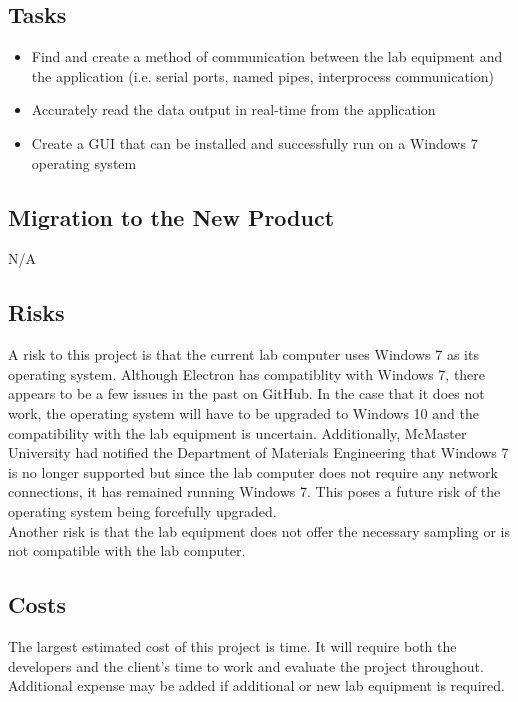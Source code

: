 \documentclass[12pt, titlepage]{article}
\begin{document}
\subsection{Tasks}
\begin{itemize}
  \item Find and create a method of communication between the lab equipment and the application (i.e. serial ports, named pipes, interprocess communication)
  \item Accurately read the data output in real-time from the application
  \item Create a GUI that can be installed and successfully run on a Windows 7 operating system
\end{itemize}

\subsection{Migration to the New Product}
N/A

\subsection{Risks}
A risk to this project is that the current lab computer uses Windows 7 as its operating system. Although Electron has compatiblity with Windows 7, there appears to be a few issues in the past on GitHub. 
In the case that it does not work, the operating system will have to be upgraded to Windows 10 and the compatibility with the lab equipment is uncertain. Additionally, McMaster University had notified the 
Department of Materials Engineering that Windows 7 is no longer supported but since the lab computer does not require any network connections, it has remained running Windows 7. This poses a future risk of 
the operating system being forcefully upgraded.\\

\noindent Another risk is that the lab equipment does not offer the necessary sampling or is not compatible with the lab computer. 

\subsection{Costs}
The largest estimated cost of this project is time. It will require both the developers and the client's time to work and evaluate the project throughout.
Additional expense may be added if additional or new lab equipment is required. 
\end{document}
